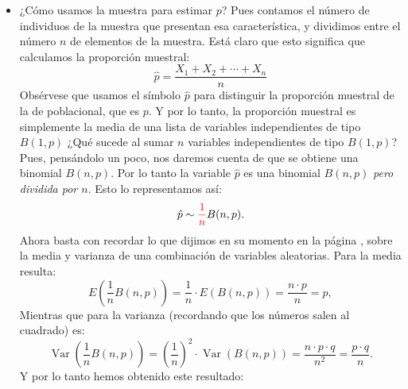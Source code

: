 \begin{itemize}
        \item ¿Cómo usamos la muestra para estimar $p$? Pues contamos el número de individuos de la muestra que presentan esa característica, y dividimos entre el número $n$ de elementos de la muestra. Está claro que esto significa que calculamos la {\sf proporción muestral:}
            \[\hat p=\dfrac{X_1+X_2+\cdots+X_n}{n}\]
            Obsérvese que usamos el símbolo $\hat p$ para distinguir la proporción muestral de la de poblacional, que es $p$. Y por lo tanto, la proporción muestral es simplemente la media de una lista de variables independientes de tipo $B(1,p)$
            ¿Qué sucede al sumar $n$ variables independientes de tipo $B(1,p)$? Pues, pensándolo un poco, nos daremos cuenta de que se obtiene una binomial $B(n,p)$. Por lo tanto la variable $\hat p$ es una binomial $B(n,p)$ {\em pero dividida por $n$}. Esto lo representamos así:
             \[\hat p \sim \textcolor{red}{\dfrac{1}{n}}B(n,p).\]
            Ahora basta con recordar lo que dijimos en su momento en la página \pageref{sec:ExperimentosBernouilliDistribucionBinomial}, sobre la media y varianza de una combinación de variables aleatorias. Para la media resulta:
            \[E\left(\dfrac{1}{n}B(n,p)\right)=\dfrac{1}{n}\cdot E(B(n,p))=\dfrac{n\cdot p}{n}=p,\]
            Mientras que para la varianza (recordando que los números salen al cuadrado) es:
            \[\operatorname{Var}\left(\dfrac{1}{n}B(n,p)\right)=\left(\dfrac{1}{n}\right)^2\cdot \operatorname{Var}(B(n,p))=\dfrac{n\cdot p\cdot q}{n^2}=\dfrac{p\cdot q}{n}.\]
            Y por lo tanto hemos obtenido este resultado:\\[3mm]
            \\[3mm]

        \end{itemize}

